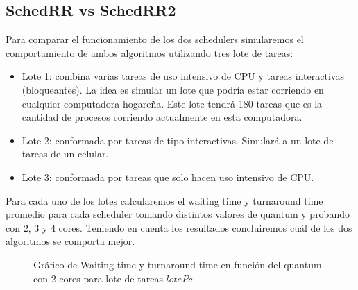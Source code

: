 \subsection{SchedRR vs SchedRR2}

Para comparar el funcionamiento de los dos schedulers simularemos el comportamiento de ambos algoritmos utilizando tres lote de tareas:
\begin{itemize}
	\item Lote 1: combina varias tareas de uso intensivo de CPU y tareas interactivas (bloqueantes). La idea es simular un lote que podría estar corriendo en cualquier computadora hogareña. Este lote tendrá 180 tareas que es la cantidad de procesos corriendo actualmente en esta computadora.
	\item Lote 2: conformada por tareas de tipo interactivas. Simulará a un lote de tareas de un celular.
	\item Lote 3: conformada por tareas que solo hacen uso intensivo de CPU.
\end{itemize}
Para cada uno de los lotes calcularemos el waiting time y turnaround time promedio para cada scheduler tomando distintos valores de quantum y probando con 2, 3 y 4 cores. Teniendo en cuenta los resultados concluiremos cuál de los dos algoritmos se comporta mejor.

\begin{figure}
\hfill
{}
\hfill
{}
\hfill
\caption{Gráfico de Waiting time y turnaround time en función del quantum con 2 cores para lote de tareas $lotePc$}
\end{figure}

